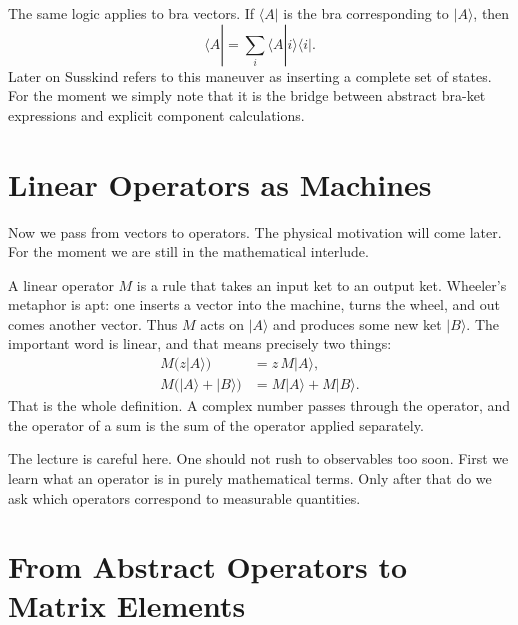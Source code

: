 The same logic applies to bra vectors. If \(\langle A|\) is the bra corresponding to \(|A\rangle\), then
\begin{equation}
\langle A|=\sum_i \langle A|i\rangle \langle i|.
\end{equation}
Later on Susskind refers to this maneuver as inserting a complete set of states. For the moment we simply note that it is the bridge between abstract bra-ket expressions and explicit component calculations.

\section{Linear Operators as Machines}

Now we pass from vectors to operators. The physical motivation will come later. For the moment we are still in the mathematical interlude.

A linear operator \(M\) is a rule that takes an input ket to an output ket. Wheeler's metaphor is apt: one inserts a vector into the machine, turns the wheel, and out comes another vector. Thus \(M\) acts on \(|A\rangle\) and produces some new ket \(|B\rangle\). The important word is linear, and that means precisely two things:
\begin{align}
M\bigl(z|A\rangle\bigr) &= z\,M|A\rangle, \\
M\bigl(|A\rangle+|B\rangle\bigr) &= M|A\rangle+M|B\rangle.
\end{align}
That is the whole definition. A complex number passes through the operator, and the operator of a sum is the sum of the operator applied separately.

The lecture is careful here. One should not rush to observables too soon. First we learn what an operator is in purely mathematical terms. Only after that do we ask which operators correspond to measurable quantities.

\section{From Abstract Operators to Matrix Elements}

